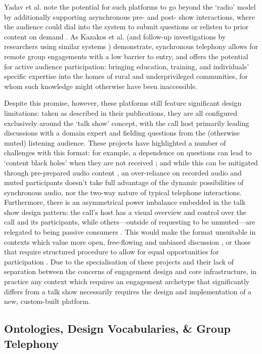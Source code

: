 Yadav et al. note the potential for such platforms to go beyond the `radio' model by additionally supporting asynchronous pre- and post- show interactions, where the audience could dial into the system to submit questions or relisten to prior content on demand \cite{Yadav2017}. As Kazakos et al. (and follow-up investigations by researchers using similar systems \cite{Talhouk2017, Yadav2017}) demonstrate, synchronous telephony allows for remote group engagements with a low barrier to entry, and offers the potential for active audience participation: bringing education, training, and individuals' specific expertise into the homes of rural and underprivileged communities, for whom such knowledge might otherwise have been inaccessible.

Despite this promise, however, these platforms still feature significant design limitations: taken as described in their publications, they are all configured exclusively around the `talk show' concept, with the call host primarily leading discussions with a domain expert and fielding questions from the (otherwise muted) listening audience. These projects have highlighted a number of challenges with this format: for example, a dependence on questions can lead to `content black holes' when they are not received \cite{Kazakos2016}; and while this can be mitigated through pre-prepared audio content \cite{Yadav2017}, an over-reliance on recorded audio and muted participants doesn't take full advantage of the dynamic possibilities of synchronous audio, nor the two-way nature of typical telephone interactions. Furthermore, there is an asymmetrical power imbalance embedded in the talk show design pattern: the call's host has a visual overview and control over the call and its participants, while others---outside of requesting to be unmuted---are relegated to being passive consumers \cite{Varghese2022}. This would make the format unsuitable in contexts which value more open, free-flowing and unbiased discussion \cite{Fiesler2019}, or those that require structured procedure to allow for equal opportunities for participation \cite{robert2020}. Due to the specialisation of these projects and their lack of separation between the concerns of engagement design and core infrastructure, in practice any context which requires an engagement archetype that significantly differs from a talk show necessarily requires the design and implementation of a new, custom-built platform.

\subsection{Ontologies, Design Vocabularies, \& Group Telephony}

